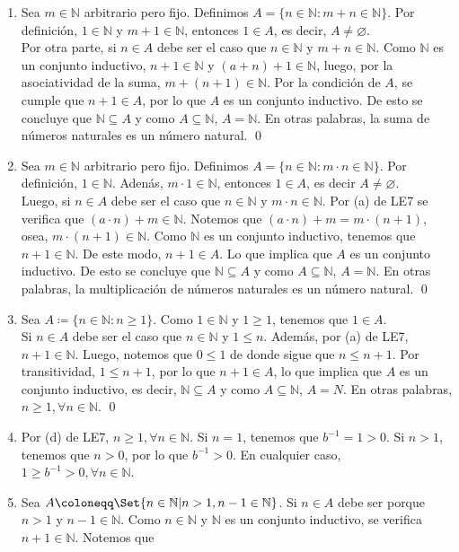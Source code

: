 \documentclass[11pt]{article}
\newcommand{\N}{\mathbb{N}}
\let\emptyset\varnothing
\let\set\Set
\begin{document}
\begin{enumerate}[label=\alph*)]
    \item Sea $m\in \N$ arbitrario pero fijo. Definimos $A=\{ n\in \N : m+n \in \N \}$. Por definición, $1\in \N$ y $m+1\in \N$, entonces $1\in A$, es decir, $A\neq \emptyset$. \\[5pt] Por otra parte, si $n\in A$ debe ser el caso que $n\in \N$ y $m+n\in \N$. Como $\N$ es un conjunto inductivo, $n+1 \in \N$ y $(a+n)+1 \in \N$, luego, por la asociatividad de la suma, $m+(n+1)\in \N$. Por la condición de $A$, se cumple que $n+1\in A$, por lo que $A$ es un conjunto inductivo. De esto se concluye que $\N\subseteq A$ y como $A\subseteq \N$, $A=\N$. En otras palabras, la suma de números naturales es un número natural. \qed
    \item Sea $m\in \N$ arbitrario pero fijo. Definimos $A=\{n\in \N: m\cdot n \in \N\}$. Por definición, $1 \in \N$. Adenás, $m\cdot 1 \in \N$, entonces $1 \in A$, es decir $A \neq \emptyset$.\\[5pt] 
    Luego, si $n \in A$ debe ser el caso que $n\in \N$ y $m \cdot n \in \N$. Por (a) de LE7 se verifica que $(a \cdot n) + m \in \N$. Notemos que $(a \cdot n) + m=m \cdot (n+1)$, osea, $m \cdot (n+1) \in \N$. Como $\N$ es un conjunto inductivo, tenemos que $n+1\in \N$. De este modo, $n+1\in A$. Lo que implica que $A$ es un conjunto inductivo. De esto se concluye que $\N \subseteq A$ y como $A\subseteq \N$, $A=\N$. En otras palabras, la multiplicación de números naturales es un número natural. \qed
    \item Sea $A\coloneqq \{n\in \N: n\geq 1\}$. Como $1\in \N$ y $1\geq 1$, tenemos que $1\in A$.\\[5pt]
    Si $n\in A$ debe ser el caso que $n\in \N$ y $1\leq n$. Además, por (a) de LE7, $n+1\in \N$. Luego, notemos que $0 \leq 1$ de donde sigue que $n \leq n+1$. Por transitividad, $1\leq n+1$, por lo que $n+1\in A$, lo que implica que $A$ es un conjunto inductivo, es decir, $\N\subseteq A$ y como $A\subseteq \N$, $A=N$. En otras palabras, $n\geq 1, \forall n\in\N$. \qed
    \item Por (d) de LE7, $n\geq 1, \forall n\in \N$. Si $n=1$, tenemos que $b^{-1}=1>0$. Si $n>1$, tenemos que $n>0$, por lo que $b^{-1}>0$. En cualquier caso, $1\geq b^{-1}>0, \forall n\in \N$.
    \item Sea $A \coloneqq \set{n\in \N | n>1, n-1\in \N}$. Si $n\in A$ debe ser porque $n>1$ y $n-1\in \N$. Como $n\in \N$ y $\N$ es un conjunto inductivo, se verifica $n+1\in\N$. Notemos que \begin{align*}

\end{align*}
\end{enumerate}
\end{document}
